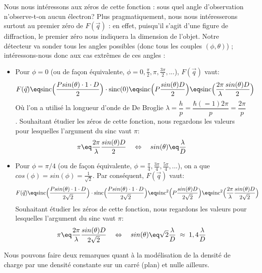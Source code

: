 Nous nous intéressons aux zéros de cette fonction : sous quel angle d'observation n'observe-t-on aucun électron? Plus pragmatiquement, nous nous intéresserons surtout au premier zéro de $F(\vec{q})$ : en effet, puisqu'il s'agit d'une figure de diffraction, le premier zéro nous indiquera la dimension de l'objet. Notre détecteur va sonder tous les angles possibles (donc tous les couples $(\phi,\theta)$) ; intéressons-nous donc aux cas extrêmes de ces angles : 
\begin{itemize}[label=$\bullet$]
    
    \item Pour $\phi=0$ (ou de façon équivalente, $\phi=0,\frac{\pi}{2},\pi,\frac{3\pi}{2},...$), $F(\vec{q})$ vaut:
    \begin{equation*}
        F(\vec{q})  \eq \text{sinc}\Big(\dfrac{P sin(\theta)\cdot 1 \cdot D}{2}\Big)\cdot \text{sinc}(0) 
        \eq \text{sinc}\Big(P\dfrac{sin(\theta)D}{2}\Big)
        \eq \text{sinc}\Big(\dfrac{2\pi}{\lambda}\dfrac{sin(\theta)D}{2}\Big)
    \end{equation*}
    Où l'on a utilisé la longueur d'onde de De Broglie $\lambda = \dfrac{h}{p} = \dfrac{\hbar(=1) 2\pi}{p} = \dfrac{2\pi}{p}$. Souhaitant étudier les zéros de cette fonction, nous regardons les valeurs pour lesquelles l'argument du sinc vaut $\pi$:
    \begin{equation*}
        \pi 
        \eq \dfrac{2\pi}{\lambda}\dfrac{sin(\theta)D}{2}
        \quad \Leftrightarrow \quad
        sin(\theta) \eq \dfrac{\lambda}{D}
    \end{equation*}
    
    \item Pour $\phi=\pi/4$ (ou de façon équivalente, $\phi=\frac{\pi}{4},\frac{3\pi}{4},\frac{5\pi}{4},...$), on a que $cos(\phi)=sin(\phi)=\frac{1}{\sqrt{2}}$. Par conséquent, $F(\vec{q})$ vaut:
    \begin{equation*}
        F(\vec{q})  \eq 
        \text{sinc}\Big(\dfrac{P sin(\theta)\cdot 1 \cdot D}{2\sqrt{2}}\Big)
        \cdot 
        \text{sinc}\Big(\dfrac{P sin(\theta)\cdot 1 \cdot D}{2\sqrt{2}}\Big)
        \eq \text{sinc}^2 \Big(P \dfrac{sin(\theta)D}{2\sqrt{2}}\Big)
        \eq \text{sinc}^2 \Big(\dfrac{2\pi}{\lambda}\dfrac{sin(\theta)D}{2\sqrt{2}}\Big)
    \end{equation*}
    Souhaitant étudier les zéros de cette fonction, nous regardons les valeurs pour lesquelles l'argument du sinc vaut $\pi$:
    \begin{equation*}
        \pi 
        \eq \dfrac{2\pi}{\lambda}\dfrac{sin(\theta)D}{2\sqrt{2}}
        \quad \Leftrightarrow \quad
        sin(\theta) \eq \sqrt{2}\dfrac{\lambda}{D} \;\approx\; 1,4\dfrac{\lambda}{D}
    \end{equation*}
\end{itemize}
Nous pouvons faire deux remarques quant à la modélisation de la densité de charge par une densité constante sur un carré (plan) et nulle ailleurs.



